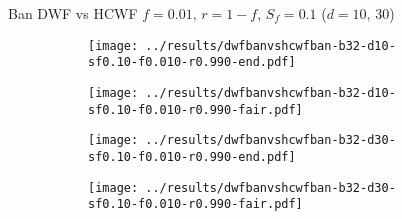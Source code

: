 \documentclass[8pt,a4paper]{beamer}
\begin{document}
		\begin{frame}{Ban DWF vs HCWF $f=0.01,\, r=1-f,\,S_f=0.1$ ($d=10,\, 30$)}
			\begin{figure}
				\begin{subfigure}{.48\textwidth}
					\centering
					\texttt{[image: ../results/dwfbanvshcwfban-b32-d10-sf0.10-f0.010-r0.990-end.pdf]}
				\end{subfigure}
				\begin{subfigure}{.48\textwidth}
					\centering
					\texttt{[image: ../results/dwfbanvshcwfban-b32-d10-sf0.10-f0.010-r0.990-fair.pdf]}
				\end{subfigure}
			\end{figure}
			
			\begin{figure}
				\begin{subfigure}{.48\textwidth}
					\centering
					\texttt{[image: ../results/dwfbanvshcwfban-b32-d30-sf0.10-f0.010-r0.990-end.pdf]}
				\end{subfigure}
				\begin{subfigure}{.48\textwidth}
					\centering
					\texttt{[image: ../results/dwfbanvshcwfban-b32-d30-sf0.10-f0.010-r0.990-fair.pdf]}
				\end{subfigure}
			\end{figure}
		\end{frame}
	
		
	
\end{document}

